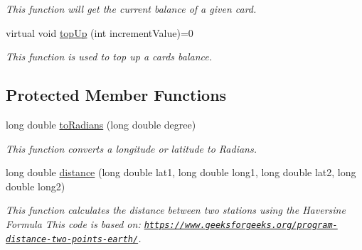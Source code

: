 \begin{DoxyCompactItemize}
\begin{DoxyCompactList}\small\item\em This function will get the current balance of a given card. \end{DoxyCompactList}\item 
virtual void \hyperlink{classovTracker_a9611f8fe5ed1937262ebcd89bd7ee617}{top\+Up} (int increment\+Value)=0
\begin{DoxyCompactList}\small\item\em This function is used to top up a cards\textquotesingle{} balance. \end{DoxyCompactList}\end{DoxyCompactItemize}
\subsection*{Protected Member Functions}
\begin{DoxyCompactItemize}
\item 
long double \hyperlink{classovTracker_afabb57769940df42bc2e5b224c4db9e5}{to\+Radians} (long double degree)
\begin{DoxyCompactList}\small\item\em This function converts a longitude or latitude to Radians. \end{DoxyCompactList}\item 
long double \hyperlink{classovTracker_acd7a68baa7199971ce76968af009ebd7}{distance} (long double lat1, long double long1, long double lat2, long double long2)
\begin{DoxyCompactList}\small\item\em This function calculates the distance between two stations using the Haversine Formula This code is based on\+: \href{https://www.geeksforgeeks.org/program-distance-two-points-earth/}{\tt https\+://www.\+geeksforgeeks.\+org/program-\/distance-\/two-\/points-\/earth/}. \end{DoxyCompactList}\end{DoxyCompactItemize}
